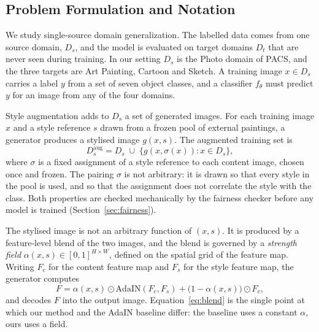 \subsection{Problem Formulation and Notation}
\label{sec:notation}

We study single-source domain generalization. The labelled data comes from
one source domain, $D_s$, and the model is evaluated on target domains
$D_t$ that are never seen during training. In our setting $D_s$ is the
Photo domain of PACS, and the three targets are Art Painting, Cartoon and
Sketch. A training image $x \in D_s$ carries a label $y$ from a set of
seven object classes, and a classifier $f_\theta$ must predict $y$ for an
image from any of the four domains.

Style augmentation adds to $D_s$ a set of generated images. For each
training image $x$ and a style reference $s$ drawn from a frozen pool of
external paintings, a generator produces a stylised image $g(x, s)$. The
augmented training set is
\begin{equation}
D_s^{\mathrm{aug}} = D_s \;\cup\; \{ g(x, \sigma(x)) : x \in D_s \},
\label{eq:augset}
\end{equation}
where $\sigma$ is a fixed assignment of a style reference to each content
image, chosen once and frozen. The pairing $\sigma$ is not arbitrary: it is
drawn so that every style in the pool is used, and so that the assignment
does not correlate the style with the class. Both properties are checked
mechanically by the fairness checker before any model is trained
(Section~\ref{sec:fairness}).

The stylised image is not an arbitrary function of $(x, s)$. It is produced
by a feature-level blend of the two images, and the blend is governed by a
\emph{strength field} $\alpha(x, s) \in [0,1]^{H \times W}$, defined on the
spatial grid of the feature map. Writing $F_c$ for the content feature map
and $F_s$ for the style feature map, the generator computes
\begin{equation}
F = \alpha(x,s) \odot \mathrm{AdaIN}(F_c, F_s) + \bigl(1 - \alpha(x,s)\bigr) \odot F_c ,
\label{eq:blend}
\end{equation}
and decodes $F$ into the output image. Equation~\eqref{eq:blend} is the
single point at which our method and the AdaIN baseline differ: the
baseline uses a constant $\alpha$, ours uses a field.

